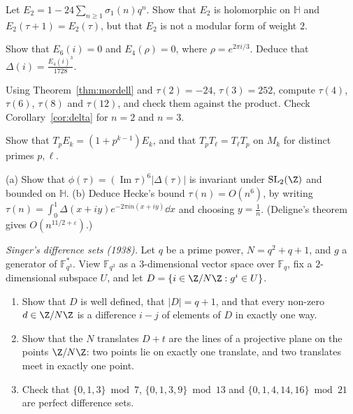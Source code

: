 \begin{exercise}[$\star$]\label{ex:e2}
Let $E_2=1-24\sum_{n\ge1}\sigma_1(n)q^n$. Show that $E_2$ is holomorphic on $\mathbb H$ and $E_2(\tau+1)=E_2(\tau)$, but that $E_2$ is not a modular form of weight $2$.
\end{exercise}

\begin{exercise}[$\star$]\label{ex:zeros}
Show that $E_6(i)=0$ and $E_4(\rho)=0$, where $\rho=e^{2\pi i/3}$. Deduce that $\Delta(i)=\frac{E_4(i)^3}{1728}$.
\end{exercise}

\begin{exercise}[$\star$]\label{ex:tausmall}
Using Theorem~\ref{thm:mordell} and $\tau(2)=-24$, $\tau(3)=252$, compute $\tau(4)$, $\tau(6)$, $\tau(8)$ and $\tau(12)$, and check them against the product. Check Corollary~\ref{cor:delta} for $n=2$ and $n=3$.
\end{exercise}

\begin{exercise}[$\star\star$]\label{ex:eisensteinhecke}
Show that $T_pE_k=(1+p^{k-1})E_k$, and that $T_pT_\ell=T_\ell T_p$ on $M_k$ for distinct primes $p,\ell$.
\end{exercise}

\begin{exercise}\label{ex:heckebound}
(a) Show that $\phi(\tau)=(\operatorname{Im}\tau)^6|\Delta(\tau)|$ is invariant under $\mathrm{SL}_2(\Z)$ and bounded on $\mathbb H$.
(b) Deduce Hecke's bound $\tau(n)=O(n^6)$, by writing $\tau(n)=\int_0^1\Delta(x+iy)e^{-2\pi in(x+iy)}\dd x$ and choosing $y=\frac1n$. (Deligne's theorem gives $O(n^{11/2+\varepsilon})$.)
\end{exercise}

\begin{exercise}[$\star\star\star$]\label{pb:singer}
\emph{Singer's difference sets (1938).} Let $q$ be a prime power, $N=q^2+q+1$, and $g$ a generator of $\mathbb F_{q^3}^*$. View
$\mathbb F_{q^3}$ as a $3$-dimensional vector space over $\mathbb F_q$, fix a $2$-dimensional subspace $U$, and let
$D=\{i\in\Z/N\Z:g^i\in U\}$.
\begin{enumerate}[label=(\alph*)]
\item Show that $D$ is well defined, that $|D|=q+1$, and that every non-zero $d\in\Z/N\Z$ is a difference $i-j$ of elements of
$D$ in exactly one way.
\item Show that the $N$ translates $D+t$ are the lines of a projective plane on the points $\Z/N\Z$: two points lie on exactly one
translate, and two translates meet in exactly one point.
\item Check that $\{0,1,3\}\bmod7$, $\{0,1,3,9\}\bmod13$ and $\{0,1,4,14,16\}\bmod21$ are perfect difference sets.
\end{enumerate}
\end{exercise}

